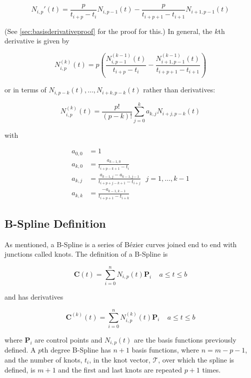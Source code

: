 \begin{equation}
\label{eqn:basisderivative}
N_{i,p}'(t) = \frac{p}{t_{i+p} - t_i} N_{i,p-1}(t) - \frac{p}{t_{i+p+1} - t_{i+1}} N_{i+1,p-1}(t)
\end{equation}

(See \cref{sec:basisderivativeproof} for the proof for this.) In general, the $k$th derivative is given by

\begin{equation}N_{i,p}^{(k)}(t) = p \left( \frac{N_{i,p-1}^{(k-1)}(t)}{t_{i+p} - t_i} - \frac{N_{i+1,p-1}^{(k-1)}(t)}{t_{i+p+1} - t_{i+1}} \right) \end{equation}

or in terms of $N_{i,p-k}(t), \ldots, N_{i+k,p-k}(t)$ rather than derivatives:

\begin{equation} N_{i,p}^{(k)}(t) = \frac{p!}{(p-k)!} \sum^k_{j=0} a_{k,j} N_{i+j,p-k}(t)  \end{equation}

with

\begin{align}
a_{0,0} &= 1\\
a_{k,0} &= \frac{a_{k-1,0}}{t_{i+p-k+1} - t_i}\\
a_{k,j} &= \frac{a_{k-1,j} - a_{k-1,j-1}}{t_{i+p+j-k+1} - t_{i+j} } ~~~ j=1,\ldots,k-1\\
a_{k,k} &= \frac{-a_{k-1,k-1}}{t_{i+p+1} - t_{i+k} }
\end{align}


\subsection{B-Spline Definition}
As mentioned, a B-Spline is a series of Bézier curves joined end to end with junctions called knots.  The definition of a B-Spline is

\begin{equation} \textbf{C}(t) = \sum^n_{i=0}N_{i,p}(t) \textbf{P}_i~~~~~a\leq t \leq b \end{equation}

and has derivatives

\begin{equation} \textbf{C}^{(k)}(t) = \sum^n_{i=0}N^{(k)}_{i,p}(t) \textbf{P}_i~~~~~a\leq t \leq b \end{equation}

where $\textbf{P}_i$ are control points and $N_{i,p}(t) $ are the basis functions previously defined. A $p$th degree B-Spline has $n+1$ basis functions, where $n = m-p-1$, and the number of knots, $t_i$, in the knot vector, $\mathcal{T}$, over which the spline is defined, is $m+1$ and the first and last knots are repeated $p+1$ times.
 
